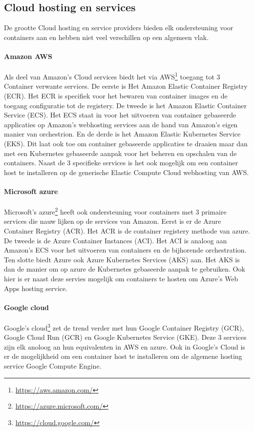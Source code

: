 \subsection{Cloud hosting en services}
De grootte Cloud hosting en service providers bieden elk ondersteuning voor containers aan en hebben niet veel verschillen op een algemeen vlak.
\paragraph{Amazon AWS}
Als deel van Amazon’s Cloud services biedt het via AWS\footnote{\url{https://aws.amazon.com/}} toegang tot 3 Container verwante services. De eerste is Het Amazon Elastic Container Registry (ECR). Het ECR is specifiek voor het bewaren van container images en de toegang configuratie tot de registery. De tweede is het Amazon Elastic Container Service (ECS). Het ECS staat in voor het uitvoeren van container gebaseerde applicaties op Amazon’s webhosting services aan de hand van Amazon’s eigen manier van orchestrion. En de derde is het Amazon Elastic Kubernetes Service (EKS). Dit laat ook toe om container gebaseerde applicaties te draaien maar dan met een Kubernetes gebaseerde aanpak voor het beheren en opschalen van de containers. Naast de 3 specifieke services is het ook mogelijk om een container host te installeren op de generische Elastic Compute Cloud webhosting van AWS.
\paragraph{Microsoft azure}
Microsoft’s azure\footnote{\url{https://azure.microsoft.com/}} heeft ook ondersteuning voor containers met 3 primaire services die nauw lijken op de services van Amazon. Eerst is er de Azure Container Registry (ACR). Het ACR is de container registery methode van azure. De tweede is de Azure Container Instances (ACI). Het ACI is analoog aan  Amazon’s ECS voor het uitvoeren van containers en de bijhorende orchestration. Ten slotte biedt Azure ook Azure Kubernetes Services (AKS) aan. Het AKS is dan de manier om op azure de Kubernetes gebaseerde aanpak te gebruiken. Ook hier is er naast deze servies mogelijk om containers te hosten om Azure’s Web Apps hosting service.
\paragraph{Google cloud}
Google’s cloud\footnote{\url{https://cloud.google.com/}} zet de trend verder met hun Google Container Registry (GCR), Google Cloud Run (GCR) en Google Kubernetes Service (GKE). Deze 3 services zijn elk anoloog an hun equivalenten in AWS en azure. Ook in Google's Cloud is er de mogelijkheid om een container host te installeren om de algemene hosting service Google Compute Engine.
